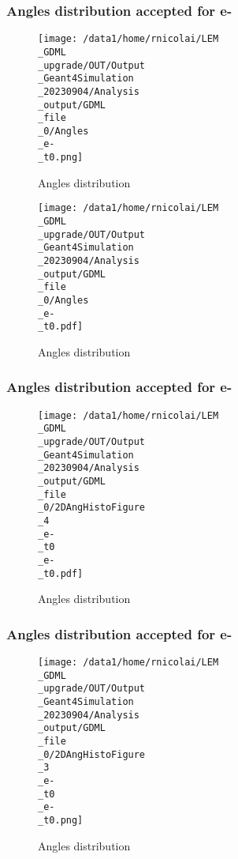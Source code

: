 \documentclass[8pt]{beamer}
\begin{document}
            \begin{frame}
                \frametitle{Angles distribution accepted for e-}
            
        \begin{figure}[h]
            \centering
            \texttt{[image: /data1/home/rnicolai/LEM\\\_GDML\\\_upgrade/OUT/Output\\\_Geant4Simulation\\\_20230904/Analysis\\\_output/GDML\\\_file\\\_0/Angles\\\_e-\\\_t0.png]}
            \caption{Angles distribution}
        \end{figure}
        
        \begin{figure}[h]
            \centering
            \texttt{[image: /data1/home/rnicolai/LEM\\\_GDML\\\_upgrade/OUT/Output\\\_Geant4Simulation\\\_20230904/Analysis\\\_output/GDML\\\_file\\\_0/Angles\\\_e-\\\_t0.pdf]}
            \caption{Angles distribution}
        \end{figure}
        
            \end{frame}
            
            \begin{frame}
                \frametitle{Angles distribution accepted for e-}
            
        \begin{figure}[h]
            \centering
            \texttt{[image: /data1/home/rnicolai/LEM\\\_GDML\\\_upgrade/OUT/Output\\\_Geant4Simulation\\\_20230904/Analysis\\\_output/GDML\\\_file\\\_0/2DAngHistoFigure\\\_4\\\_e-\\\_t0\\\_e-\\\_t0.pdf]}
            \caption{Angles distribution}
        \end{figure}
        
            \end{frame}
            
            \begin{frame}
                \frametitle{Angles distribution accepted for e-}
            
        \begin{figure}[h]
            \centering
            \texttt{[image: /data1/home/rnicolai/LEM\\\_GDML\\\_upgrade/OUT/Output\\\_Geant4Simulation\\\_20230904/Analysis\\\_output/GDML\\\_file\\\_0/2DAngHistoFigure\\\_3\\\_e-\\\_t0\\\_e-\\\_t0.png]}
            \caption{Angles distribution}
        \end{figure}
        
            \end{frame}
            
\end{document}
